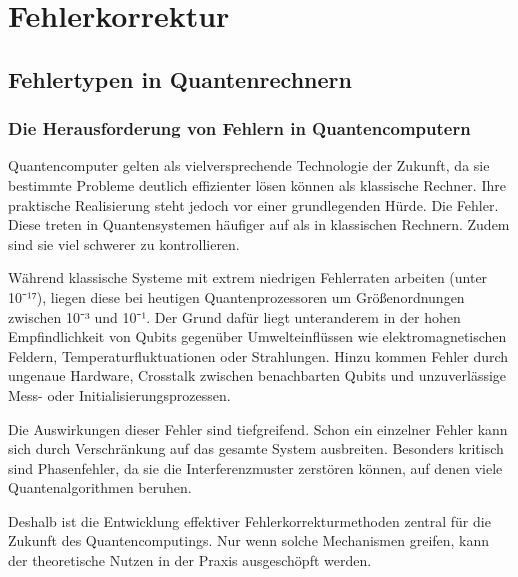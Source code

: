 \chapter{Fehlerkorrektur}
\label{error_correction} %



\section{Fehlertypen in Quantenrechnern}\label{chap:QEC1}

\subsection{Die Herausforderung von Fehlern in Quantencomputern}
Quantencomputer gelten als vielversprechende Technologie der Zukunft, da sie bestimmte Probleme deutlich effizienter lösen können als klassische Rechner. Ihre praktische Realisierung steht jedoch vor einer grundlegenden Hürde. Die Fehler. Diese treten in Quantensystemen häufiger auf als in klassischen Rechnern. Zudem sind sie viel schwerer zu kontrollieren.

Während klassische Systeme mit extrem niedrigen Fehlerraten arbeiten (unter 10⁻¹⁷), liegen diese bei heutigen Quantenprozessoren um Größenordnungen zwischen 10⁻³ und 10⁻¹. Der Grund dafür liegt unteranderem in der hohen Empfindlichkeit von Qubits gegenüber Umwelteinflüssen wie elektromagnetischen Feldern, Temperaturfluktuationen oder Strahlungen. Hinzu kommen Fehler durch ungenaue Hardware, Crosstalk zwischen benachbarten Qubits und unzuverlässige Mess- oder Initialisierungsprozessen.

Die Auswirkungen dieser Fehler sind tiefgreifend. Schon ein einzelner Fehler kann sich durch Verschränkung auf das gesamte System ausbreiten. Besonders kritisch sind Phasenfehler, da sie die Interferenzmuster zerstören können, auf denen viele Quantenalgorithmen beruhen.

Deshalb ist die Entwicklung effektiver Fehlerkorrekturmethoden zentral für die Zukunft des Quantencomputings. Nur wenn solche Mechanismen greifen, kann der theoretische Nutzen in der Praxis ausgeschöpft werden.


